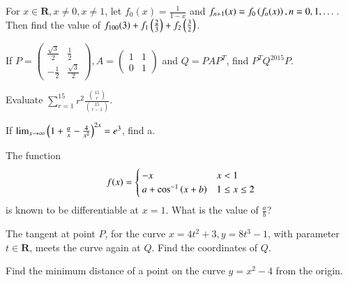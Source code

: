 \documentclass[journal,12pt,onecolumn]{IEEEtran}
\begin{document}
\begin{problem}
For $x \in \mathbf{R}, x \neq 0, x \neq 1$, let $f_0(x) = \frac{1}{1-x}$ 
and $f_{n+1}(x) = f_0\left(f_n(x)\right), n = 0, 1, \dots $.  Then find the value of
$f_{100}(3) + f_1\left(\frac{2}{3}\right)+f_2\left(\frac{3}{2}\right)$.
\end{problem}
%
\solution

\begin{problem}
If $P = 
\begin{pmatrix}
\frac{\sqrt{3}}{2} & \frac{1}{2} \\
-\frac{1}{2} & \frac{\sqrt{3}}{2}
\end{pmatrix}, A = 
\begin{pmatrix}
1 & 1 \\
0 & 1
\end{pmatrix}
$ and $Q = P A P^{T}$, find $P^{T}Q^{2015} P$.
\end{problem}
\solution

\begin{problem}
Evaluate $\sum_{r=1}^{15}r^2 \frac{\binom{15}{r}}{\binom{15}{r-1}}$.
\end{problem}
\solution

\begin{problem}
If $\lim_{x \rightarrow \infty} \left(1 + \frac{a}{x} - \frac{4}{x^2}\right)^{2x} = e^3$, find a.
\end{problem}
\solution

\begin{problem}
The function
%
\begin{equation}
f(x)=
\begin{cases}
-x & x < 1 \\
a + \cos^{-1}\left(x + b\right) & 1 \leq x \leq 2
\end{cases}
\end{equation}
%
is known to be differentiable at $x=1$.  What is the value of $\frac{a}{b}$?
\end{problem}
\solution

\begin{problem}
The tangent at point $P$, for the curve $x = 4t^2+3, y = 8t^3-1$, with parameter $t \in \mathbf{R}$, meets the curve again at $Q$.  Find the coordinates of $Q$.
\end{problem}
\solution

\begin{problem}
Find the minimum distance of a point on the curve $y = x^2 -4$ from the origin.
\end{problem}
\solution

\end{document}
